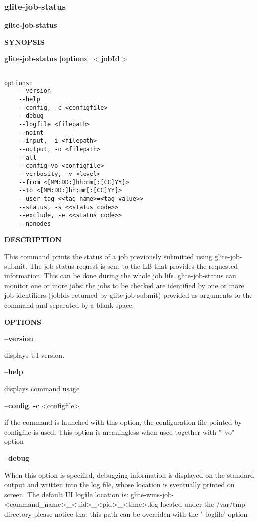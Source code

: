 \subsubsection{glite-job-status}
\label{glite-job-status}

\medskip
\textbf{glite-job-status}
\smallskip


\medskip
\textbf{SYNOPSIS}
\smallskip

\textbf{glite-job-status [options] $<$jobId$>$}
{\begin{verbatim}

options:
	--version
	--help
	--config, -c <configfile>
	--debug
	--logfile <filepath>
	--noint
	--input, -i <filepath>
	--output, -o <filepath>
	--all
	--config-vo <configfile>
	--verbosity, -v <level>
	--from <[MM:DD:]hh:mm[:[CC]YY]>
	--to <[MM:DD:]hh:mm[:[CC]YY]>
	--user-tag <<tag name>=<tag value>>
	--status, -s <<status code>>
	--exclude, -e <<status code>>
	--nonodes
\end{verbatim}

\medskip
\textbf{DESCRIPTION}
\smallskip


This command prints the status of a job previously submitted using glite-job-submit.
The job status request is sent to the LB that provides the requested information.
This can be done during the whole job life.
glite-job-status can monitor one or more jobs: the jobs to be checked are identified by one or more job identifiers (jobIds returned by glite-job-submit) provided as arguments to the command and separated by a blank space.

\medskip
\textbf{OPTIONS}
\smallskip

\textbf{--version}

displays UI version.

\textbf{--help}

displays command usage

\textbf{--config}, \textbf{-c} <configfile>

if the command is launched with this option, the configuration file pointed by configfile is used. This option is meaningless when used together with "--vo" option

\textbf{--debug}

When this option is specified, debugging information is displayed on the standard output and written into the log file, whose location is eventually printed on screen.
The default UI logfile location is:
glite-wms-job-<command\_name>\_<uid>\_<pid>\_<time>.log  located under the /var/tmp directory
please notice that this path can be overriden with the '--logfile' option

}
